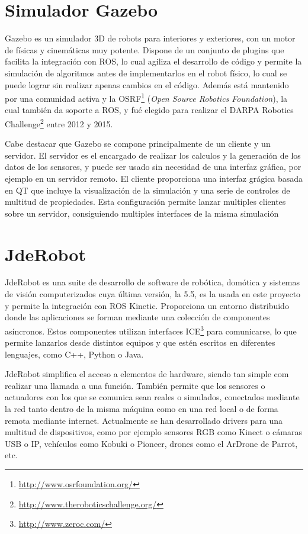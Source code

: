 \section{Simulador Gazebo}
\label{sec:plat_gazebo}

Gazebo\cite{gazebo} es un simulador 3D de robots para interiores y exteriores, con un motor de físicas y cinemáticas muy potente. Dispone de un conjunto de plugins que facilita la integración con ROS, lo cual agiliza el desarrollo de código y permite la simulación de algoritmos antes de implementarlos en el robot físico, lo cual se puede lograr sin realizar apenas cambios en el código. Además está mantenido por una comunidad activa y la OSRF\footnote{\url{http://www.osrfoundation.org/}} (\textit{Open Source Robotics Foundation}), la cual también da soporte a ROS, y fué elegido para realizar el DARPA Robotics Challenge\footnote{\url{http://www.theroboticschallenge.org/}} entre 2012 y 2015.

Cabe destacar que Gazebo se compone principalmente de un cliente y un servidor. El servidor es el encargado de realizar los calculos y la generación de los datos de los sensores, y puede ser usado sin necesidad de una interfaz gráfica, por ejemplo en un servidor remoto. El cliente proporciona una interfaz grágica basada en QT que incluye la visualización de la simulación y una serie de controles de multitud de propiedades. Esta configuración permite lanzar multiples clientes sobre un servidor, consiguiendo multiples interfaces de la misma simulación

\section{JdeRobot}
\label{sec:plat_jderobot}

JdeRobot\cite{jderobot} es una suite de desarrollo de software de robótica, domótica y sistemas de visión computerizados cuya última versión, la 5.5, es la usada en este proyecto y permite la integración con ROS Kinetic. Proporciona un entorno distribuido donde las aplicaciones se forman mediante una colección de componentes asíncronos. Estos componentes utilizan interfaces ICE\footnote{\url{http://www.zeroc.com/}} para comunicarse, lo que permite lanzarlos desde distintos equipos y que estén escritos en diferentes lenguajes, como C++, Python o Java.

JdeRobot simplifica el acceso a elementos de hardware, siendo tan simple com realizar una llamada a una función. También permite que los sensores o actuadores con los que se comunica sean reales o simulados, conectados mediante la red tanto dentro de la misma máquina como en una red local o de forma remota mediante internet. Actualmente se han desarrollado drivers para una multitud de dispositivos, como por ejemplo sensores RGB como Kinect o cámaras USB o IP, vehículos como Kobuki o Pioneer, drones como el ArDrone de Parrot, etc.

